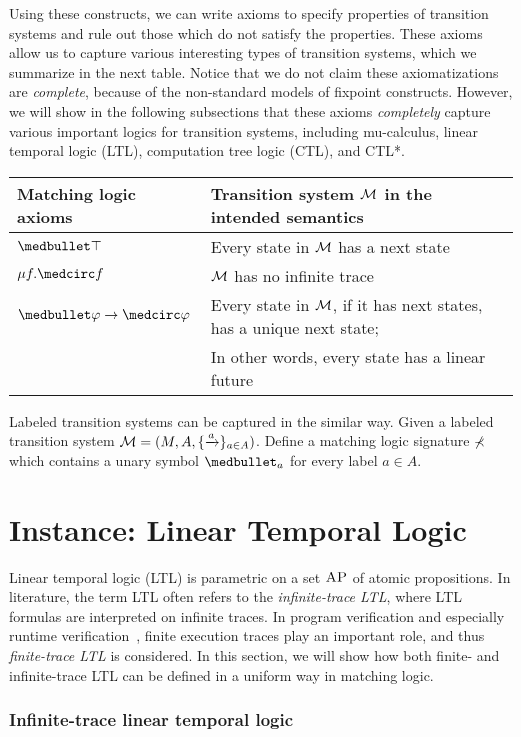 \documentclass{amsart}
\begin{document}
Using these constructs, we can write axioms to specify properties of transition
systems
and rule out those which do not satisfy the properties.
These axioms allow us to capture various interesting types of transition
systems,
which we summarize in the next table.
Notice that we do not claim these axiomatizations are \emph{complete},
because of the non-standard models of fixpoint constructs.
However, we will show in the following subsections that these axioms
\emph{completely} capture various important logics for transition systems,
including mu-calculus, linear temporal logic (LTL), computation tree logic
(CTL),
and CTL*.
\begin{center}
	\begin{tabular}{ll}
		Matching logic axioms & Transition system $\mathcal{M}$ in the intended semantics
		\\\hline
		\Inf $\snext \top$ &
		Every state in $\mathcal{M}$ has a next state
		\\
		\Fin $\mu f . \wnext f$ &
		$\mathcal{M}$ has no infinite trace
		\\
		\Lin $\snext \varphi \imp \wnext \varphi$ &
		Every state in $\mathcal{M}$, if it has next states, has a unique next state;
		\\& In other words, every state has a linear future
	\end{tabular}
\end{center} 

Labeled transition systems can be captured in the similar way.
Given a labeled transition system $\mathcal{M} = (M, A, \{ \xrightarrow{a} \}_{a \in A})$.
Define a matching logic signature $\mathbb{\Sigma}$ which contains a unary symbol
$\snext_a$
for every label $a \in A$.

\section{Instance: Linear Temporal Logic}
\label{sec_LTL}


Linear temporal logic (LTL) is parametric 
on a set $\textsc{AP}$ of atomic propositions.
In literature, the term LTL often refers to the \emph{infinite-trace LTL},
where LTL formulas are interpreted on infinite traces.
In program verification and especially runtime verification~\cite{bibid},
finite execution traces play an important role, and thus
\emph{finite-trace LTL} is considered.
In this section, we will show how
both finite- and infinite-trace LTL can be defined in a uniform way in matching
logic.

\subsubsection{Infinite-trace linear temporal logic}
\end{document}
